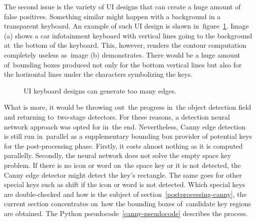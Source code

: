 The second issue is the variety of UI designs that can create a huge amount of false positives. Something similar might happen with a background in a transparent keyboard. An example of such UI design is shown in~figure~\ref{canny-ui-problem}. Image (a) shows a car infotainment keyboard with vertical lines going to the background at~the bottom of the keyboard. This, however, renders the contour computation completely useless as~image (b) demonstrates. There would be a huge amount of~bounding boxes produced not only for the bottom vertical lines but also for the horizontal lines under the characters symbolizing the keys.

\begin{figure}[!tbh]
    \centering
    \caption{UI keyboard designs can generate too many edges.}
    \label{canny-ui-problem}
\end{figure}

 What is more, it would be throwing out~the progress in~the object detection field and returning to~two-stage detectors. For these reasons, a detection neural network approach was opted for in~the end. Nevertheless, Canny edge detection is still run in~parallel as a supplementary bounding box provider of potential keys for the post-processing phase. Firstly, it costs almost nothing as it is computed parallelly. Secondly, the neural network does not solve the empty space key problem. If there is no icon or word on~the space key or it is not detected, the Canny edge detector might detect the key's rectangle. The same goes for other special keys such as shift if the icon or word is not detected. Which special keys are double-checked and how is the subject of section~\ref{postprocessing-canny}, the current section concentrates on~how the bounding boxes of~candidate key regions are obtained. The Python pseudocode~\ref{canny-pseudocode} describes the process.

